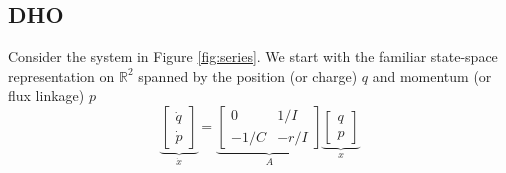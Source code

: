 \subsection{DHO}
\label{sec: DHO}
Consider the system in Figure \ref{fig:series}.
We start with the familiar state-space representation on $\mathbb{R}^{2}$ spanned by the position (or charge) $q$ and momentum (or flux linkage) $p$
\begin{equation}
\label{eq: dynAx}
    \underbrace{\begin{bmatrix}
    \dot{q}\\
    \dot{p}
    \end{bmatrix}}_{\dot{x}}=\underbrace{\begin{bmatrix}
    0 &1/I\\
    -1/C &-{r}/{I}
    \end{bmatrix}}_{A}\underbrace{
    \begin{bmatrix}
    q\\p
    \end{bmatrix}}_{x}
\end{equation} 


